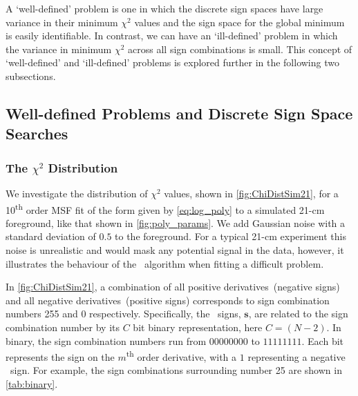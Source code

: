 A `well-defined' problem is one in which the discrete sign spaces have large variance in their minimum $\chi^2$ values and the sign space for the global minimum is easily identifiable. In contrast, we can have an `ill-defined' problem in which the variance in minimum $\chi^2$ across all sign combinations is small. This concept of `well-defined' and `ill-defined' problems is explored further in the following two subsections.

\subsection{Well-defined Problems and Discrete Sign Space Searches}
\label{sec:well_defined}

\subsubsection{The $\chi^2$ Distribution}

We investigate the distribution of $\chi^2$ values, shown in \cref{fig:ChiDistSim21}, for a 10\textsuperscript{th} order MSF fit of the form given by \cref{eq:log_poly} to a simulated 21-cm foreground, like that shown in \cref{fig:poly_params}. We add Gaussian noise with a standard deviation of $0.5$ to the foreground. For a typical 21-cm experiment this noise is unrealistic and would mask any potential signal in the data, however, it illustrates the behaviour of the \maxsmooth~algorithm when fitting a difficult problem.

In \cref{fig:ChiDistSim21}, a combination of all positive derivatives~(negative signs) and all negative derivatives~(positive signs) corresponds to sign combination numbers 255 and 0 respectively. Specifically, the \maxsmooth~signs, $\mathbf{s}$, are related to the sign combination number by its $C$ bit binary representation, here $C = (N -2)$. In binary, the sign combination numbers run from $00000000$ to $11111111$. Each bit represents the sign on the $m$\textsuperscript{th} order derivative, with a $1$ representing a negative \maxsmooth~sign. For example, the sign combinations surrounding number 25 are shown in \cref{tab:binary}.

